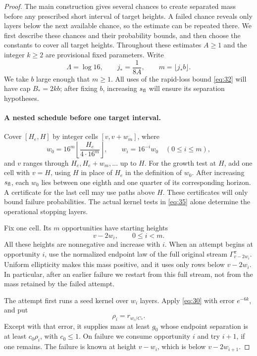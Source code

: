 \begin{proof}
The main construction gives several chances to create separated mass
before any prescribed short interval of target heights. A failed chance
reveals only layers below the next available chance, so the estimate can
be repeated there. We first describe these chances and their probability
bounds, and then choose the constants to cover all target heights.
Throughout these estimates \(A\ge1\) and the integer \(k\ge2\)
are provisional fixed parameters. Write
\[
 \Lambda=\log16,\qquad j_*=\frac1{8A},\qquad
 m=\lfloor j_*b\rfloor.
\]
We take \(b\) large enough that \(m\ge1\). All uses of the rapid-loss
bound \eqref{eq:32} will have cap \(B_*=2kb\); after fixing \(b\),
increasing \(s_{\rm fl}\) will ensure its separation hypotheses.

\paragraph{A nested schedule before one target interval.}
Cover \([H_e,H]\) by integer cells \([v,v+w_m]\), where
\[
 w_0=16^m\left\lfloor\frac{H_e}{4\cdot16^m}\right\rfloor,
 \qquad w_i=16^{-i}w_0\quad(0\le i\le m),
\]
and \(v\) ranges through \(H_e,H_e+w_m,\ldots\) up to \(H\).
For the growth test at \(H\), add one cell with \(v=H\), using
\(H\) in place of \(H_e\) in the definition of \(w_0\).
After increasing \(s_{\rm fl}\), each \(w_0\) lies between one
eighth and one quarter of its corresponding horizon. A certificate for
the last cell may use paths above \(H\). These certificates will only
bound failure probabilities. The actual kernel tests in \eqref{eq:35}
alone determine the operational stopping layers.

Fix one cell. Its \(m\) opportunities have starting heights
\[
 v-2w_i,\qquad 0\le i<m.
\]
All these heights are nonnegative and increase with \(i\). When an
attempt begins at opportunity \(i\), use the normalized endpoint law of
the full original stream \(\Gamma_{v-2w_i}^{\pi}\). Uniform ellipticity makes this mass positive, and it uses only rows below \(v-2w_i\). In particular, after an
earlier failure we restart from this full stream, not from the mass
retained by the failed attempt.

The attempt first runs a seed kernel over \(w_i\) layers. Apply
\eqref{eq:30} with error \(e^{-6k}\), and put
\[
 \rho_i=r_{w_i/C_*}.
\]
Except with that error, it supplies mass at least \(g_0\) whose endpoint
separation is at least \(c_0\rho_i\), with \(c_0\le1\).
On failure we consume opportunity \(i\) and try \(i+1\), if one
remains. The failure is known at height \(v-w_i\), which is below
\(v-2w_{i+1}\).


\end{proof}
